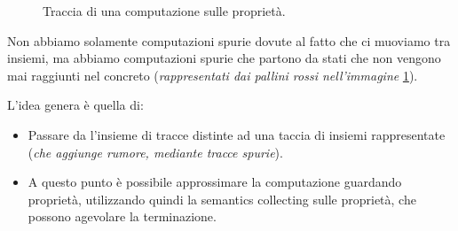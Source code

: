 \begin{figure}[H]
  \caption{Traccia di una computazione sulle proprietà.}
  \label{fig:compupropr}
\end{figure}
Non abbiamo solamente computazioni spurie dovute al fatto che ci muoviamo tra insiemi, ma abbiamo 
computazioni spurie che partono da stati che non vengono mai raggiunti nel concreto (\textit{rappresentati 
dai pallini rossi nell'immagine} \ref{fig:compupropr}).

L'idea genera è quella di:
\begin{itemize}
  \item Passare da l'insieme di tracce distinte ad una taccia di insiemi rappresentate (\textit{che 
  aggiunge rumore, mediante tracce spurie}).
  \item A questo punto è possibile approssimare la computazione guardando proprietà, utilizzando quindi 
  la semantics collecting sulle proprietà, che possono agevolare la terminazione.
\end{itemize}